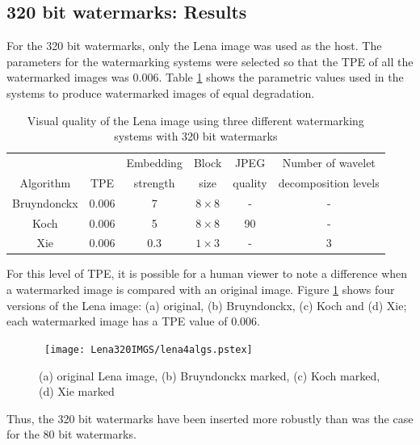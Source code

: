 \documentclass[12pt]{report}
\begin{document}
\subsection{320 bit watermarks: Results}
For the 320 bit watermarks, only the Lena image was used as the host. The parameters for the watermarking
systems were selected so that the TPE of all the watermarked images was 0.006. 
Table \ref{tab:3schemes320BKX} shows the parametric values used in the systems to produce watermarked
images of equal degradation.
\begin{table}[htb]
\tiny
        \begin{center}
                \begin{tabular}{|c|c|c|c|c|c|} \hline
				&		& Embedding	& Block		& JPEG			& Number of wavelet \\
                Algorithm       & TPE           & strength    	& size    	& quality  		& decomposition levels  \\ \hline
                Bruyndonckx     & 0.006         & 7             & $8\times 8$   & -                     & -                     \\ \hline
                Koch            & 0.006         & 5             & $8\times 8$   & 90                    & -                     \\ \hline
                Xie             & 0.006         & 0.3           & $1\times 3$   & -                     & 3                     \\ \hline
                \end{tabular}
		\caption{Visual quality of the Lena image using three different watermarking systems with 320 bit watermarks}
                \label{tab:3schemes320BKX}
        \end{center}
\end{table}
\normalsize
For this level of TPE, 
it is possible for a human viewer to note a difference when a watermarked image is compared with an
original image.
Figure \ref{fig:Lena320BKX} shows 
four versions of the Lena image: 
(a) original, 
(b) Bruyndonckx, (c) Koch and (d) Xie;
each watermarked image has a TPE value of 0.006.
\begin{figure}[p]
	\centerline{ \hbox{
	\texttt{[image: Lena320IMGS/lena4algs.pstex]}
	}}
	\caption{(a) original Lena image, (b) Bruyndonckx marked, (c) Koch marked, (d) Xie marked}
	\label{fig:Lena320BKX}
\end{figure}
Thus, the 320 bit watermarks have been inserted more robustly than 
was the case for the 80 bit watermarks. 
\end{document}
